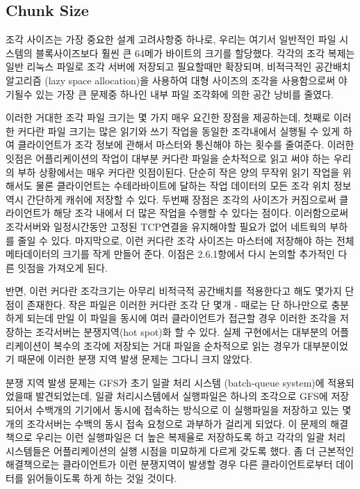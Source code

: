 \documentclass[twocolumn]{article}
\begin{document}
\subsection{Chunk Size}

 조각 사이즈는 가장 중요한 설계 고려사항중 하나로, 우리는 여기서 일반적인 파일 시스템의 블록사이즈보다 훨씬 큰 64메가 바이트의 크기를 할당했다.  각각의 조각 복제는 일반 리눅스 파일로 조각 서버에 저장되고 필요할때만 확장되며,  비적극적인 공간배치 알고리즘 (lazy space allocation)을 사용하여 대형 사이즈의 조각을 사용함으로써 야기될수 있는 가장 큰 문제중 하나인 내부 파일 조각화에 의한 공간 낭비를 줄였다.

 이러한 거대한 조각 파일 크기는 몇 가지 매우 요긴한 장점을 제공하는데, 첫째로 이러한 커다란 파일 크기는 많은 읽기와 쓰기 작업을 동일한 조각내에서 실행될 수 있게 하여 클라이언트가 조각 정보에 관해서 마스터와 통신해야 하는 횟수를 줄여준다.  이러한 잇점은 어플리케이션의 작업이 대부분 커다란 파일을 순차적으로 읽고 써야 하는 우리의 부하 상황에서는 매우 커다란 잇점이된다. 단순히 작은 양의 무작위 읽기 작업을 위해서도 물론 클라이언트는 수테라바이트에 달하는 작업 데이터의 모든 조각 위치 정보역시 간단하게 캐쉬에 저장할 수 있다. 두번째 장점은 조각의 사이즈가 커짐으로써 클라이언트가 해당 조각 내에서 더 많은 작업을 수행할 수 있다는 점이다. 이러함으로써 조각서버와 일정시간동안 고정된 TCP연결을 유지해야할 필요가 없어 네트웍의 부하를 줄일 수 있다. 마지막으로, 이런 커다란 조각 사이즈는 마스터에 저장해야 하는 전체 메타데이터의 크기를 작게 만들어 준다.  이점은 2.6.1항에서 다시 논의할 추가적인 다른 잇점을 가져오게 된다.

 반면, 이런 커다란 조각크기는 아무리 비적극적 공간배치를 적용한다고 해도 몇가지 단점이 존재한다.  작은 파일은 이러한 커다란 조각 단 몇개 - 때로는 단 하나만으로 충분하게 되는데 만일 이 파일을 동시에 여러 클라이언트가 접근할 경우 이러한 조각을 저장하는 조각서버는 분쟁지역(hot spot)화 할 수 있다.  실제 구현에서는 대부분의 어플리케이션이 복수의 조각에 저장되는 거대 파일을 순차적으로 읽는 경우가 대부분이었기 때문에 이러한 분쟁 지역 발생 문제는 그다니 크지 않았다.

 분쟁 지역 발생 문제는 GFS가 초기 일괄 처리 시스템 (batch-queue system)에 적용되었을때 발견되었는데, 일괄 처리시스템에서 실행파일은 하나의 조각으로 GFS에 저장되어서 수백개의 기기에서 동시에 접속하는 방식으로 이 실행파일을 저장하고 있는 몇개의 조각서버는 수백의 동시 접속 요청으로 과부하가 걸리게 되었다.  이 문제의 해결책으로 우리는 이런 실행파일은 더 높은 복제율로 저장하도록 하고 각각의 일괄 처리 시스템들은 어플리케이션의 실행 시점을 미묘하게 다르게 갖도록 했다.  좀 더 근본적인 해결책으로는 클라이언트가 이런 분쟁지역이 발생할 경우 다른 클라이언트로부터 데이터를 읽어들이도록 하게 하는 것일 것이다.
\end{document}
